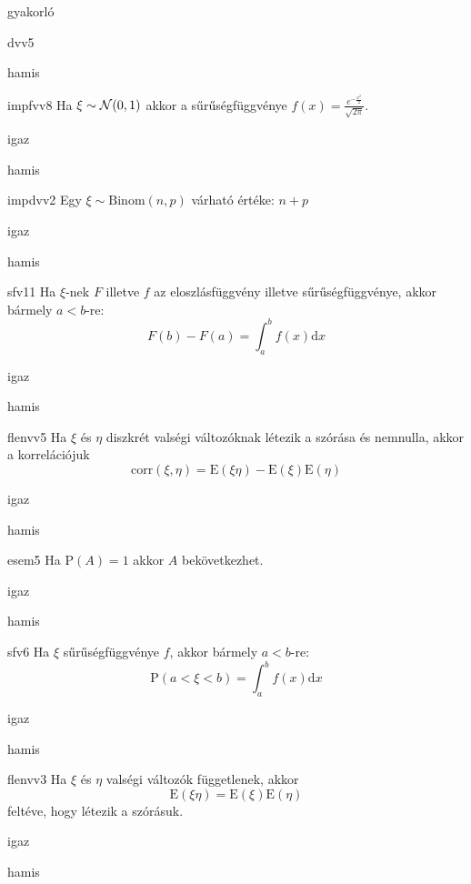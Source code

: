 \documentclass[12pt]{article}
\begin{document}
\begin{quiz}{gyakorló}
\begin{multi}[feedback={Az adott feltételek mellet a várható érték egy súlyozott közép.}]{dvv5}
\item hamis
\end{multi}
\begin{multi}[feedback={Def.}]{impfvv8}
Ha $\xi\sim {\cal N}(0,1)$ akkor a sűrűségfüggvénye $f(x)=\frac{e^{-\frac{x^2}{2}}}{\sqrt{2\pi}}$.
\item* igaz
\item hamis
\end{multi}
\begin{multi}[feedback={$\xi=\xi_1+{...\:}+\xi_n$, ahol $\xi_k$ Bernoulli és $\mathrm{E}(\xi_k)=p$+$\mathrm{E}$-additívitása}]{impdvv2}
Egy $\xi\sim \mathrm{Binom}(n,p)$ várható értéke: $n+p$
\item igaz
\item* hamis
\end{multi}
\begin{multi}[feedback={Def.}]{sfv11}
Ha $\xi$-nek $F$ illetve $f$ az eloszlásfüggvény illetve sűrűségfüggvénye, akkor bármely $a<b$-re:
$$
F(b)-F(a)=\int_{a}^{b}f(x)\mathrm{d } x
$$
\item* igaz
\item hamis
\end{multi}
\begin{multi}[feedback={Def.}]{flenvv5}
Ha $\xi$ és $\eta$ diszkrét valségi változóknak létezik a szórása és nemnulla, akkor a 
korrelációjuk
$$
\mathrm{corr}(\xi,\eta)=\mathrm{E}(\xi\eta)-\mathrm{E}(\xi)\mathrm{E}(\eta)
$$
\item igaz
\item* hamis
\end{multi}
\begin{multi}[feedback={Nókoment.}]{esem5}
Ha $\mathrm{P}(A)=1$ akkor $A$ bekövetkezhet.
\item* igaz
\item hamis
\end{multi}
\begin{multi}[feedback={Def.}]{sfv6}
Ha $\xi$ sűrűségfüggvénye $f$, akkor bármely $a<b$-re:
$$
\mathrm{P}(a<\xi<b)=\int_{a}^{b}f(x)\mathrm{d } x
$$
\item* igaz
\item hamis
\end{multi}
\begin{multi}[feedback={Tétel.}]{flenvv3}
Ha $\xi$ és $\eta$ valségi változók függetlenek, akkor
$$
\mathrm{E}(\xi \eta)=\mathrm{E}(\xi)\mathrm{E}(\eta)
$$
feltéve, hogy létezik a szórásuk.
\item* igaz
\item hamis
\end{multi}

\end{quiz}
\end{document}
